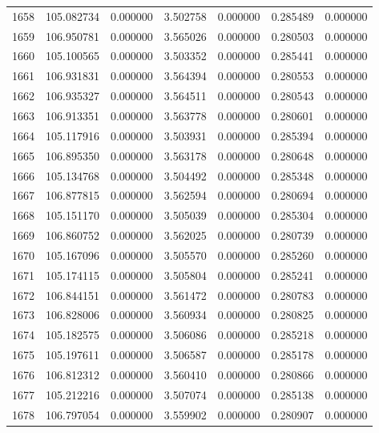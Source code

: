 \begin{tabular}{rrrrrrr}
1658 & 105.082734 &    0.000000 &  3.502758 &    0.000000 &    0.285489 &  0.000000 \\
1659 & 106.950781 &    0.000000 &  3.565026 &    0.000000 &    0.280503 &  0.000000 \\
1660 & 105.100565 &    0.000000 &  3.503352 &    0.000000 &    0.285441 &  0.000000 \\
1661 & 106.931831 &    0.000000 &  3.564394 &    0.000000 &    0.280553 &  0.000000 \\
1662 & 106.935327 &    0.000000 &  3.564511 &    0.000000 &    0.280543 &  0.000000 \\
1663 & 106.913351 &    0.000000 &  3.563778 &    0.000000 &    0.280601 &  0.000000 \\
1664 & 105.117916 &    0.000000 &  3.503931 &    0.000000 &    0.285394 &  0.000000 \\
1665 & 106.895350 &    0.000000 &  3.563178 &    0.000000 &    0.280648 &  0.000000 \\
1666 & 105.134768 &    0.000000 &  3.504492 &    0.000000 &    0.285348 &  0.000000 \\
1667 & 106.877815 &    0.000000 &  3.562594 &    0.000000 &    0.280694 &  0.000000 \\
1668 & 105.151170 &    0.000000 &  3.505039 &    0.000000 &    0.285304 &  0.000000 \\
1669 & 106.860752 &    0.000000 &  3.562025 &    0.000000 &    0.280739 &  0.000000 \\
1670 & 105.167096 &    0.000000 &  3.505570 &    0.000000 &    0.285260 &  0.000000 \\
1671 & 105.174115 &    0.000000 &  3.505804 &    0.000000 &    0.285241 &  0.000000 \\
1672 & 106.844151 &    0.000000 &  3.561472 &    0.000000 &    0.280783 &  0.000000 \\
1673 & 106.828006 &    0.000000 &  3.560934 &    0.000000 &    0.280825 &  0.000000 \\
1674 & 105.182575 &    0.000000 &  3.506086 &    0.000000 &    0.285218 &  0.000000 \\
1675 & 105.197611 &    0.000000 &  3.506587 &    0.000000 &    0.285178 &  0.000000 \\
1676 & 106.812312 &    0.000000 &  3.560410 &    0.000000 &    0.280866 &  0.000000 \\
1677 & 105.212216 &    0.000000 &  3.507074 &    0.000000 &    0.285138 &  0.000000 \\
1678 & 106.797054 &    0.000000 &  3.559902 &    0.000000 &    0.280907 &  0.000000 \\

\end{tabular}

